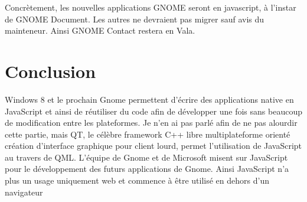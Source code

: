 Concrètement, les nouvelles applications GNOME seront en javascript, à l'instar de GNOME Document. Les autres ne devraient pas migrer sauf avis du mainteneur. Ainsi GNOME Contact restera en Vala.


\section{Conclusion}
Windows 8 et le prochain Gnome permettent d'écrire des applications native en JavaScript et ainsi de réutiliser du code afin de développer une fois sans beaucoup de modification entre les plateformes.
Je n'en ai pas parlé afin de ne pas alourdir cette partie, mais QT, le célèbre framework C++ libre multiplateforme orienté création d'interface graphique pour client lourd, permet l'utilisation de JavaScript au travers de QML.   
L'équipe de Gnome et de Microsoft misent sur JavaScript pour le développement des futurs applications de Gnome. 
Ainsi JavaScript n'a plus un usage uniquement web et commence à être utilisé en dehors d'un navigateur




